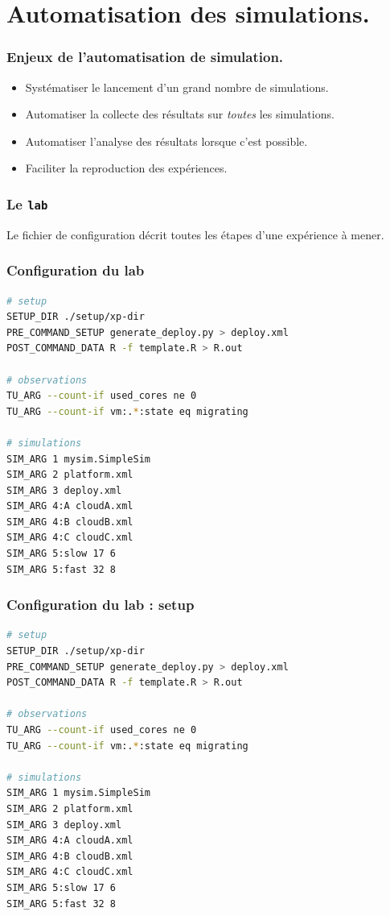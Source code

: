\documentclass{beamer}
\newcommand{\lab}{\texttt{lab}}
\begin{document}
\section{Automatisation des simulations.}

\begin{frame}
	\frametitle{Enjeux de l'automatisation de simulation.}
	\begin{itemize}
		\item Systématiser le lancement d'un grand nombre de simulations.
		\item Automatiser la collecte des résultats sur \emph{toutes} 
			les simulations.
		\item Automatiser l'analyse des résultats lorsque c'est possible.
		\item Faciliter la reproduction des expériences. 
	\end{itemize}
\end{frame}

\begin{frame}
	\frametitle{Le \lab}
	\resizebox{\textwidth}{!}{}
	Le fichier de configuration décrit toutes les étapes d'une expérience à
	mener.
\end{frame}

\begin{frame}[fragile]
	\frametitle{Configuration du lab}
\begin{lstlisting}[language=bash,basicstyle=\tt\footnotesize,backgroundcolor=\color{gray!10},
morekeywords={SETUP_DIR,TU_ARG,PRE_COMMAND_SETUP,POST_COMMAND_DATA,SIM_ARG},
keywordstyle=\color{red!90},commentstyle=\color{blue!70}]
# setup
SETUP_DIR ./setup/xp-dir
PRE_COMMAND_SETUP generate_deploy.py > deploy.xml
POST_COMMAND_DATA R -f template.R > R.out

# observations
TU_ARG --count-if used_cores ne 0
TU_ARG --count-if vm:.*:state eq migrating

# simulations
SIM_ARG 1 mysim.SimpleSim
SIM_ARG 2 platform.xml 
SIM_ARG 3 deploy.xml
SIM_ARG 4:A cloudA.xml
SIM_ARG 4:B cloudB.xml 
SIM_ARG 4:C cloudC.xml
SIM_ARG 5:slow 17 6
SIM_ARG 5:fast 32 8
\end{lstlisting}
\end{frame}

\begin{frame}[fragile]
	\frametitle{Configuration du lab : setup}
\begin{lstlisting}[language=bash,basicstyle=\tt\footnotesize,
morekeywords={SETUP_DIR,TU_ARG,PRE_COMMAND_SETUP,POST_COMMAND_DATA,SIM_ARG},
keywordstyle=\color{red!90},commentstyle=\color{blue!70},
linebackgroundcolor={\ifnum\value{lstnumber}<5\color{green!50}\else\color{gray!10}\fi}
]
# setup
SETUP_DIR ./setup/xp-dir
PRE_COMMAND_SETUP generate_deploy.py > deploy.xml
POST_COMMAND_DATA R -f template.R > R.out

# observations
TU_ARG --count-if used_cores ne 0
TU_ARG --count-if vm:.*:state eq migrating

# simulations
SIM_ARG 1 mysim.SimpleSim
SIM_ARG 2 platform.xml 
SIM_ARG 3 deploy.xml
SIM_ARG 4:A cloudA.xml
SIM_ARG 4:B cloudB.xml 
SIM_ARG 4:C cloudC.xml
SIM_ARG 5:slow 17 6
SIM_ARG 5:fast 32 8
\end{lstlisting}
\end{frame}
\end{document}
